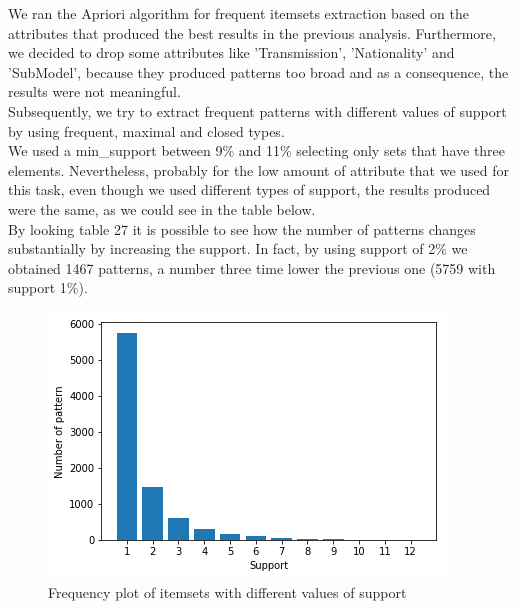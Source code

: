 \documentclass{article}
\begin{document}
	We ran the Apriori algorithm for frequent itemsets extraction based on the attributes that produced the best results in the previous analysis. Furthermore, we decided to drop some attributes like 'Transmission', 'Nationality' and 'SubModel', because they produced patterns too broad and as a consequence, the results were not meaningful.\\
	Subsequently, we try to extract frequent patterns with different values of support by using frequent, maximal and closed types.\\
	We used a min\_support between 9\% and 11\% selecting only sets that have three elements. Nevertheless, probably for the low amount of attribute that we used for this task, even though we used different types of support, the results produced were the same, as we could see in the table below.\\
	By looking table 27 it is possible to see how the number of patterns changes substantially by increasing the support. In fact, by using support of 2\%  we obtained 1467 patterns, a number three time lower the previous one (5759 with support 1\%).\\
	
	
	\begin{figure}[H]
		\centering
		\includegraphics[width=.4\textwidth]{support.png}
		\caption{Frequency plot of itemsets with different values of support}
		\label{fig:hyper_rf_us}
	\end{figure}
	
	
	
\end{document}

